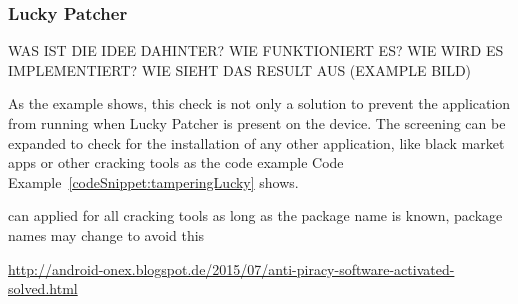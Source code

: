 \subsubsection{Lucky Patcher} \label{subsection:counter-improve-tampering-luckypatcher}


WAS IST DIE IDEE DAHINTER? WIE FUNKTIONIERT ES? WIE WIRD ES IMPLEMENTIERT? WIE SIEHT DAS RESULT AUS (EXAMPLE BILD)\newline

As the example shows, this check is not only a solution to prevent the application from running when Lucky Patcher is present on the device. The screening can be expanded to check for the installation of any other application, like black market apps or other cracking tools as the code example Code Example~\ref{codeSnippet:tamperingLucky} shows.

can applied for all cracking tools as long as the package name is known, package names may change to avoid this

\url{http://android-onex.blogspot.de/2015/07/anti-piracy-software-activated-solved.html}\newline


